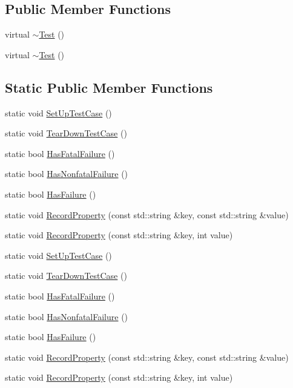 \subsection*{Public Member Functions}
\begin{DoxyCompactItemize}
\item 
virtual \hyperlink{classtesting_1_1_test_a2b0a62f1e667bbe8d8cb18d785bfa991}{$\sim$\-Test} ()
\item 
virtual \hyperlink{classtesting_1_1_test_ad99dc9b12208fd4bffc367f0a1e3df1b}{$\sim$\-Test} ()
\end{DoxyCompactItemize}
\subsection*{Static Public Member Functions}
\begin{DoxyCompactItemize}
\item 
static void \hyperlink{classtesting_1_1_test_a5ccbac42fee8c5b00b0bfe89b6c49d79}{Set\-Up\-Test\-Case} ()
\item 
static void \hyperlink{classtesting_1_1_test_af374706cbaf0ffc460f4fd04e7c150f1}{Tear\-Down\-Test\-Case} ()
\item 
static bool \hyperlink{classtesting_1_1_test_a5e83604628ef542af888d631566ff60c}{Has\-Fatal\-Failure} ()
\item 
static bool \hyperlink{classtesting_1_1_test_a8c00e8cc6fe10616b480bd54d2a426cb}{Has\-Nonfatal\-Failure} ()
\item 
static bool \hyperlink{classtesting_1_1_test_a7a00be7dd0a6bfdc8d47a1b784623613}{Has\-Failure} ()
\item 
static void \hyperlink{classtesting_1_1_test_a1559ce1c83f56993b582650c091535a7}{Record\-Property} (const std\-::string \&key, const std\-::string \&value)
\item 
static void \hyperlink{classtesting_1_1_test_a373da47b491b1e64e355d22d6ec99b5b}{Record\-Property} (const std\-::string \&key, int value)
\item 
static void \hyperlink{classtesting_1_1_test_a5ccbac42fee8c5b00b0bfe89b6c49d79}{Set\-Up\-Test\-Case} ()
\item 
static void \hyperlink{classtesting_1_1_test_af374706cbaf0ffc460f4fd04e7c150f1}{Tear\-Down\-Test\-Case} ()
\item 
static bool \hyperlink{classtesting_1_1_test_a0a89846458f0e8ed1c9457c957e8182a}{Has\-Fatal\-Failure} ()
\item 
static bool \hyperlink{classtesting_1_1_test_a07e896f1b1836f8ac075c26d7b7c9fb8}{Has\-Nonfatal\-Failure} ()
\item 
static bool \hyperlink{classtesting_1_1_test_a7a00be7dd0a6bfdc8d47a1b784623613}{Has\-Failure} ()
\item 
static void \hyperlink{classtesting_1_1_test_ae0448aec9e389fab70f6a75a59ff6aa2}{Record\-Property} (const std\-::string \&key, const std\-::string \&value)
\item 
static void \hyperlink{classtesting_1_1_test_af602903efb17730b977304fc56500881}{Record\-Property} (const std\-::string \&key, int value)
\end{DoxyCompactItemize}
